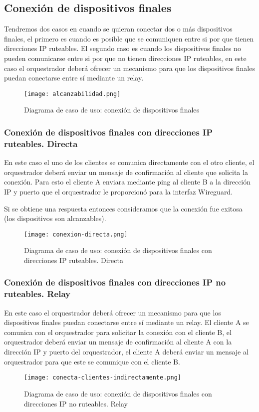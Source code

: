 \subsection{Conexión de dispositivos finales}

Tendremos dos casos en cuando se quieran conectar dos o más dispositivos finales, el primero es cuando es posible que se comuniquen entre si por que tienen direcciones IP ruteables.
El segundo caso es cuando los dispositivos finales no pueden comunicarse entre si por que no tienen direcciones IP ruteables, en este caso el orquestrador deberá ofrecer un mecanismo para que los dispositivos finales puedan conectarse entre sí mediante un relay.
\begin{figure}[h!]
    \centering
    \texttt{[image: alcanzabilidad.png]}
    \caption{Diagrama de caso de uso: conexión de dispositivos finales}
\end{figure}

\subsubsection{Conexión de dispositivos finales con direcciones IP ruteables. Directa}

En este caso el uno de los clientes se comunica directamente con el otro cliente, el orquestrador deberá enviar un mensaje de confirmación al cliente que solicita la conexión. 
Para esto el cliente A enviara mediante ping al cliente B a la dirección IP y puerto que el orquestrador le proporcionó para la interfaz Wireguard.

Si se obtiene una respuesta entonces consideramos que la conexión fue exitosa (los dispositivos son alcanzables). 
\begin{figure}[h!]
    \centering
    \texttt{[image: conexion-directa.png]}
    \caption{Diagrama de caso de uso: conexión de dispositivos finales con direcciones IP ruteables. Directa}
\end{figure}


\subsubsection{Conexión de dispositivos finales con direcciones IP no ruteables. Relay}

En este caso el orquestrador deberá ofrecer un mecanismo para que los dispositivos finales puedan conectarse entre sí mediante un relay. 
El cliente A se comunica con el orquestrador para solicitar la conexión con el cliente B, el orquestrador deberá enviar un mensaje de confirmación al cliente A con la dirección IP y puerto del orquestrador, el cliente A deberá enviar un mensaje al orquestrador para que este se comunique con el cliente B. 

\begin{figure}[h!]
    \centering
    \texttt{[image: conecta-clientes-indirectamente.png]}
    \caption{Diagrama de caso de uso: conexión de dispositivos finales con direcciones IP no ruteables. Relay}
\end{figure}
